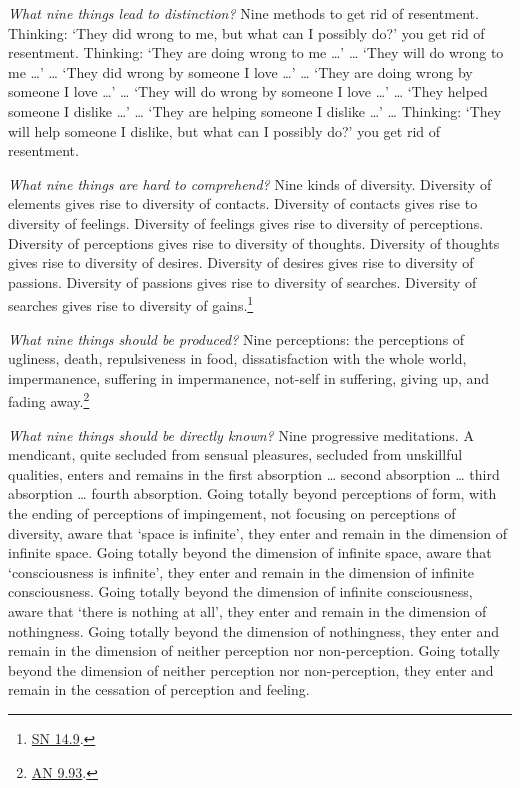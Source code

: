 \documentclass[12pt,openany]{book}%
\begin{document}
\emph{What nine things lead to distinction?} Nine methods to get rid of resentment. Thinking: ‘They did wrong to me, but what can I possibly do?’ you get rid of resentment. Thinking: ‘They are doing wrong to me …’ … ‘They will do wrong to me …’ … ‘They did wrong by someone I love …’ … ‘They are doing wrong by someone I love …’ … ‘They will do wrong by someone I love …’ … ‘They helped someone I dislike …’ … ‘They are helping someone I dislike …’ … Thinking: ‘They will help someone I dislike, but what can I possibly do?’ you get rid of resentment. 

\emph{What nine things are hard to comprehend?} Nine kinds of diversity. Diversity of elements gives rise to diversity of contacts. Diversity of contacts gives rise to diversity of feelings. Diversity of feelings gives rise to diversity of perceptions. Diversity of perceptions gives rise to diversity of thoughts. Diversity of thoughts gives rise to diversity of desires. Diversity of desires gives rise to diversity of passions. Diversity of passions gives rise to diversity of searches. Diversity of searches gives rise to diversity of gains.\footnote{\href{https://suttacentral.net/sn14.9/en/sujato}{SN 14.9}. } 

\emph{What nine things should be produced?} Nine perceptions: the perceptions of ugliness, death, repulsiveness in food, dissatisfaction with the whole world, impermanence, suffering in impermanence, not-self in suffering, giving up, and fading away.\footnote{\href{https://suttacentral.net/an9.93/en/sujato}{AN 9.93}. } 

\emph{What nine things should be directly known?} Nine progressive meditations. A mendicant, quite secluded from sensual pleasures, secluded from unskillful qualities, enters and remains in the first absorption … second absorption … third absorption … fourth absorption. Going totally beyond perceptions of form, with the ending of perceptions of impingement, not focusing on perceptions of diversity, aware that ‘space is infinite’, they enter and remain in the dimension of infinite space. Going totally beyond the dimension of infinite space, aware that ‘consciousness is infinite’, they enter and remain in the dimension of infinite consciousness. Going totally beyond the dimension of infinite consciousness, aware that ‘there is nothing at all’, they enter and remain in the dimension of nothingness. Going totally beyond the dimension of nothingness, they enter and remain in the dimension of neither perception nor non-perception. Going totally beyond the dimension of neither perception nor non-perception, they enter and remain in the cessation of perception and feeling. 
\end{document}

